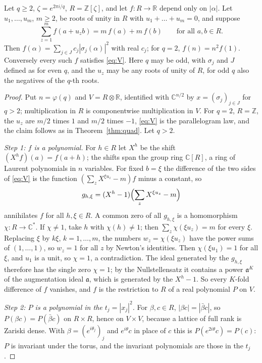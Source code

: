 \begin{theorem}\label{thm:vsl}
Let $q\ge2$, $\zeta=e^{2\pi i/q}$, $R=\mathbb{Z}[\zeta]$, and let $f\colon R\to\mathbb{R}$ depend only on $|\alpha|$. Let $u_1,\dots,u_m$, $m\ge2$, be roots of unity in $R$ with $u_1+\dots+u_m=0$, and suppose
\begin{equation}\label{eq:V}
\sum_{z=1}^{m}f(a+u_zb)=m\,f(a)+m\,f(b)\qquad\text{for all }a,b\in R .
\end{equation}
Then $f(\alpha)=\sum_{j\in J}c_j|\sigma_j(\alpha)|^2$ with real $c_j$; for $q=2$, $f(n)=n^2f(1)$. Conversely every such $f$ satisfies \eqref{eq:V}. Here $q$ may be odd, with $\sigma_j$ and $J$ defined as for even $q$, and the $u_z$ may be any roots of unity of $R$, for odd $q$ also the negatives of the $q$-th roots.
\end{theorem}
\begin{proof}
Put $n=\varphi(q)$ and $V=R\otimes\mathbb{R}$, identified with $\mathbb{C}^{n/2}$ by $x=(\sigma_j)_{j\in J}$ for $q>2$; multiplication in $R$ is componentwise multiplication in $V$. For $q=2$, $R=\mathbb{Z}$, the $u_z$ are $m/2$ times $1$ and $m/2$ times $-1$, \eqref{eq:V} is the parallelogram law, and the claim follows as in Theorem~\ref{thm:quad}. Let $q>2$.

\emph{Step 1: $f$ is a polynomial.} For $h\in R$ let $X^h$ be the shift $(X^hf)(a)=f(a+h)$; the shifts span the group ring $\mathbb{C}[R]$, a ring of Laurent polynomials in $n$ variables. For fixed $b=\xi$ the difference of the two sides of \eqref{eq:V} is the function $(\sum_zX^{\xi u_z}-m)f$ minus a constant, so
\[
g_{h,\xi}=(X^h-1)\Bigl(\sum_zX^{\xi u_z}-m\Bigr)
\]
annihilates $f$ for all $h,\xi\in R$. A common zero of all $g_{h,\xi}$ is a homomorphism $\chi\colon R\to\mathbb{C}^*$. If $\chi\ne1$, take $h$ with $\chi(h)\ne1$; then $\sum_z\chi(\xi u_z)=m$ for every $\xi$. Replacing $\xi$ by $k\xi$, $k=1,\dots,m$, the numbers $w_z=\chi(\xi u_z)$ have the power sums of $(1,\dots,1)$, so $w_z=1$ for all $z$ by Newton's identities. Then $\chi(\xi u_1)=1$ for all $\xi$, and $u_1$ is a unit, so $\chi=1$, a contradiction. The ideal generated by the $g_{h,\xi}$ therefore has the single zero $\chi=1$; by the Nullstellensatz it contains a power $\mathfrak{a}^K$ of the augmentation ideal $\mathfrak{a}$, which is generated by the $X^h-1$. So every $K$-fold difference of $f$ vanishes, and $f$ is the restriction to $R$ of a real polynomial $P$ on $V$.

\emph{Step 2: $P$ is a polynomial in the $t_j=|x_j|^2$.} For $\beta,c\in R$, $|\beta c|=|\bar\beta c|$, so $P(\beta c)=P(\bar\beta c)$ on $R\times R$, hence on $V\times V$, because a lattice of full rank is Zariski dense. With $\beta=(e^{i\theta_j})_j$ and $e^{i\theta}c$ in place of $c$ this is $P(e^{2i\theta}c)=P(c)$: $P$ is invariant under the torus, and the invariant polynomials are those in the $t_j$.


\end{proof}
